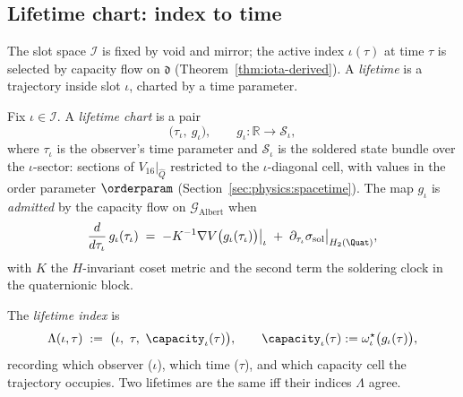 \subsection{Lifetime chart: index to time}
\label{sec:observer:lifetime}

The slot space $\mathcal{I}$ is fixed by void and mirror; the active index
$\iota(\tau)$ at time $\tau$ is selected by capacity flow on $\mathfrak{d}$
(Theorem~\ref{thm:iota-derived}). A \emph{lifetime} is a trajectory inside
slot $\iota$, charted by a time parameter.

\begin{definition}\label{def:lifetime}
Fix $\iota\in\mathcal{I}$. A \emph{lifetime chart} is a pair
\begin{equation}\label{eq:lifetime-chart}
  \bigl(\tau_\iota,\ g_\iota\bigr),
  \qquad
  g_\iota:\mathbb{R}\longrightarrow \mathcal{S}_\iota,
\end{equation}
where $\tau_\iota$ is the observer's time parameter and $\mathcal{S}_\iota$ is
the soldered state bundle over the $\iota$-sector: sections of
$V_{16}|_{\hat Q}$ restricted to the $\iota$-diagonal cell, with values in the
order parameter $\orderparam$ (Section~\ref{sec:physics:spacetime}).
The map $g_\iota$ is \emph{admitted} by the capacity flow on
$\mathcal{G}_{\mathrm{Albert}}$ when
\begin{equation}\label{eq:lifetime-admitted}
  \frac{d}{d\tau_\iota}\, g_\iota(\tau_\iota)
  \;=\;
  -K^{-1}\nabla V\bigl(g_\iota(\tau_\iota)\bigr)\big|_{\iota}
  \;+\;
  \partial_{\tau_\iota}\sigma_{\mathrm{sol}}\big|_{H_2(\Quat)},
\end{equation}
with $K$ the $H$-invariant coset metric and the second term the soldering
clock in the quaternionic block.
\end{definition}

\begin{definition}\label{def:lifetime-index}
The \emph{lifetime index} is
\begin{equation}\label{eq:lifetime-index}
  \Lambda(\iota,\tau) \;:=\; \bigl(\iota,\ \tau,\ \capacity_\iota(\tau)\bigr),
  \qquad
  \capacity_\iota(\tau):=\omega^\star_\iota\bigl(g_\iota(\tau)\bigr),
\end{equation}
recording which observer ($\iota$), which time ($\tau$), and which capacity
cell the trajectory occupies. Two lifetimes are the same iff their indices
$\Lambda$ agree.
\end{definition}

